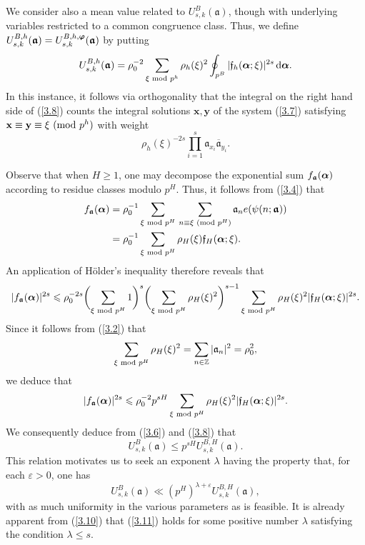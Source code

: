 \documentclass[12pt,reqno]{amsart}
\theoremstyle{definition}
\theoremstyle{remark}
\numberwithin{equation}{section}
\newcommand{\mmod}[1]{\,\,(\text{\rm mod}\,\,#1)}
\newcommand{\nmod}[1]{\,\,\text{\rm mod}\,\,#1}
\def\bfx{{\mathbf x}}
\def\bfy{{\mathbf y}}
\def\dbZ{{\mathbb Z}}\def\dbQ{{\mathbb Q}}
\def\gra{{\mathfrak a}}\def\grA{{\mathfrak A}}\def\bfgra{{\boldsymbol \gra}}
\def\grf{{\mathfrak f}}\def\grF{{\mathfrak F}}
\def\lam{{\lambda}} \def\Lam{{\Lambda}} \def\Lamtil{{\widetilde \Lambda}}
\def\eps{\varepsilon}
\def\le{\leqslant} \def\ge{\geqslant} \def\pleq{\preccurlyeq} \def\ple{\prec}
\def\d{{\,{\rm d}}}
\begin{document}
\par We consider also a mean value related to $U_{s,k}^B(\bfgra)$, though with 
underlying variables restricted to a common congruence class. Thus, we define 
$U_{s,k}^{B,h}(\bfgra)=U_{s,k}^{B,h,\bfvarphi}(\bfgra)$ by putting
\begin{equation}\label{3.8}
U_{s,k}^{B,h}(\bfgra)=\rho_0^{-2}\sum_{\xi\nmod{p^h}}\rho_h(\xi)^2\oint_{p^B}
|\grf_h(\bfalp;\xi)|^{2s}\d\bfalp .
\end{equation}
In this instance, it follows via orthogonality that the integral on the right hand side of 
(\ref{3.8}) counts the integral solutions $\bfx,\bfy$ of the system (\ref{3.7}) satisfying 
$\bfx\equiv \bfy\equiv \xi \mmod{p^h}$ with weight
$$\rho_h(\xi)^{-2s}\prod_{i=1}^s\gra_{x_i}{\overline \gra_{y_i}}.$$

\par Observe that when $H\ge 1$, one may decompose the exponential sum 
$f_\bfgra(\bfalp)$ according to residue classes modulo $p^H$. Thus, it follows from 
(\ref{3.4}) that
\begin{align*}
f_\bfgra(\bfalp)&=\rho_0^{-1}\sum_{\xi\nmod{p^H}}\,\sum_{n\equiv \xi\mmod{p^H}}
\gra_ne(\psi(n;\bfgra))\\
&=\rho_0^{-1}\sum_{\xi\nmod{p^H}}\rho_H(\xi)\grf_H(\bfalp;\xi).
\end{align*}
An application of H\"older's inequality therefore reveals that
$$|f_\bfgra(\bfalp)|^{2s}\le \rho_0^{-2s}\biggl( \sum_{\xi\nmod{p^H}}1\biggr)^s
\biggl( \sum_{\xi\nmod{p^H}}\rho_H(\xi)^2\biggr)^{s-1}\sum_{\xi\nmod{p^H}}
\rho_H(\xi)^2|\grf_H(\bfalp;\xi)|^{2s}.$$
Since it follows from (\ref{3.2}) that
$$\sum_{\xi\nmod{p^H}}\rho_H(\xi)^2=\sum_{n\in \dbZ}|\gra_n|^2=\rho_0^2,$$
we deduce that
\begin{equation}\label{3.9}
|f_\bfgra(\bfalp)|^{2s}\le \rho_0^{-2}p^{sH}\sum_{\xi\nmod{p^H}}\rho_H(\xi)^2
|\grf_H(\bfalp;\xi)|^{2s}.
\end{equation}
We consequently deduce from (\ref{3.6}) and (\ref{3.8}) that
\begin{equation}\label{3.10}
U_{s,k}^B(\bfgra)\le p^{sH}U_{s,k}^{B,H}(\bfgra).
\end{equation}
This relation motivates us to seek an exponent $\lam$ having the property that, for each 
$\eps>0$, one has
\begin{equation}\label{3.11}
U_{s,k}^B(\bfgra)\ll (p^H)^{\lam+\eps}U_{s,k}^{B,H}(\bfgra),
\end{equation}
with as much uniformity in the various parameters as is feasible. It is already apparent from 
(\ref{3.10}) that (\ref{3.11}) holds for some positive number $\lam$ satisfying the 
condition $\lam\le s$.
\end{document}
